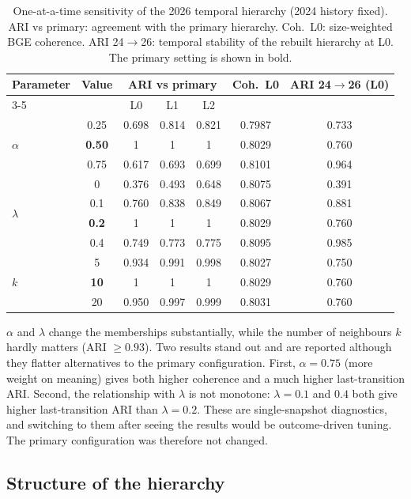 \documentclass[11pt,a4paper]{article}
\theoremstyle{remark}
\begin{document}
\begin{table}[!htbp]
\centering
\caption{One-at-a-time sensitivity of the 2026 temporal hierarchy (2024 history fixed). ARI
vs primary: agreement with the primary hierarchy. Coh.\ L0: size-weighted BGE coherence.
ARI 24$\to$26: temporal stability of the rebuilt hierarchy at L0. The primary setting is
shown in bold.}
\label{tab:sens}
\small
\begin{tabular}{lcccccc}
\toprule
Parameter & Value & \multicolumn{3}{c}{ARI vs primary} & Coh.\ L0 & ARI 24$\to$26 (L0)\\
\cmidrule(lr){3-5}
& & L0 & L1 & L2 & & \\
\midrule
\multirow{3}{*}{$\alpha$} & 0.25 & 0.698 & 0.814 & 0.821 & 0.7987 & 0.733\\
 & \textbf{0.50} & 1 & 1 & 1 & 0.8029 & 0.760\\
 & 0.75 & 0.617 & 0.693 & 0.699 & 0.8101 & 0.964\\
\midrule
\multirow{4}{*}{$\lambda$} & 0 & 0.376 & 0.493 & 0.648 & 0.8075 & 0.391\\
 & 0.1 & 0.760 & 0.838 & 0.849 & 0.8067 & 0.881\\
 & \textbf{0.2} & 1 & 1 & 1 & 0.8029 & 0.760\\
 & 0.4 & 0.749 & 0.773 & 0.775 & 0.8095 & 0.985\\
\midrule
\multirow{3}{*}{$k$} & 5 & 0.934 & 0.991 & 0.998 & 0.8027 & 0.750\\
 & \textbf{10} & 1 & 1 & 1 & 0.8029 & 0.760\\
 & 20 & 0.950 & 0.997 & 0.999 & 0.8031 & 0.760\\
\bottomrule
\end{tabular}
\end{table}

$\alpha$ and $\lambda$ change the memberships substantially, while the number of neighbours
$k$ hardly matters (ARI $\ge0.93$). Two results stand out and are reported although they
flatter alternatives to the primary configuration. First, $\alpha=0.75$ (more weight on
meaning) gives both higher coherence and a much higher last-transition ARI. Second, the
relationship with $\lambda$ is not monotone: $\lambda=0.1$ and $0.4$ both give higher
last-transition ARI than $\lambda=0.2$. These are single-snapshot diagnostics, and switching
to them after seeing the results would be outcome-driven tuning. The primary configuration
was therefore not changed.

\subsection{Structure of the hierarchy}
\end{document}

